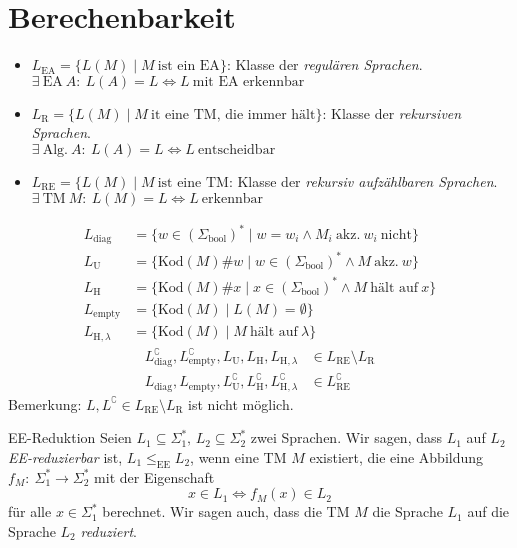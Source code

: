 \documentclass[a4paper,10pt]{article}
\begin{document}
\section{Berechenbarkeit}
\begin{itemize}
    \item $L_\textrm{EA} = \{L(M) \;|\; M\ \text{ist ein EA}\}$: Klasse der \emph{regulären Sprachen}.\\
    $\exists\ \text{EA}\ A:\: L(A) = L \iff L\ \text{mit EA erkennbar}$
    \item $L_\textrm{R} = \{L(M) \;|\; M\ \text{it eine TM, die immer hält}\}$: Klasse der \emph{rekursiven Sprachen}.\\
    $\exists\ \text{Alg.}\ A:\: L(A) = L \iff L\ \text{entscheidbar}$
    \item $L_\textrm{RE} = \{L(M) \;|\; M\ \text{ist eine TM}$: Klasse der \emph{rekursiv aufzählbaren Sprachen}.\\
    $\exists\ \text{TM}\ M:\: L(M) = L \iff L\ \text{erkennbar}$
\end{itemize}
\begin{align*}
    L_\textrm{diag} &= \{w \in (\Sigma_\textrm{bool})^* \;|\; w = w_i \land M_i\ \text{akz.}\ w_i\ \text{nicht}\}\\
    L_\textrm{U} &= \{\textrm{Kod}(M) \# w \;|\; w \in (\Sigma_\textrm{bool})^* \land M\ \text{akz.}\ w\}\\
    L_\textrm{H} &= \{\textrm{Kod}(M) \# x \;|\; x \in (\Sigma_\textrm{bool})^* \land M\ \text{hält auf}\ x\}\\
    L_\textrm{empty} &= \{\textrm{Kod}(M) \;|\; L(M) = \emptyset\}\\
    L_{\textrm{H}, \lambda} &= \{\textrm{Kod}(M) \;|\; M\ \text{hält auf}\ \lambda\}
\end{align*}
\begin{align*}
    L_\textrm{diag}^\complement, L_\textrm{empty}^\complement, L_\textrm{U}, L_\textrm{H}, L_{\textrm{H}, \lambda} &\in L_\textrm{RE} \setminus L_\textrm{R}\\
    L_\textrm{diag}, L_\textrm{empty}, L_\textrm{U}^\complement, L_\textrm{H}^\complement, L_{\textrm{H}, \lambda}^\complement &\in L_\textrm{RE}^\complement
\end{align*}
Bemerkung: $L, L^\complement \in L_\textrm{RE} \setminus L_\textrm{R}$ ist nicht möglich.
\begin{mainbox}{EE-Reduktion}
    Seien $L_1 \subseteq \Sigma_1^*,\, L_2 \subseteq \Sigma_2^*$ zwei Sprachen. Wir sagen, dass $L_1$ auf $L_2$ \emph{EE-reduzierbar} ist, \emph{$L_1 \leq_\textrm{EE} L_2$}, wenn eine TM $M$ existiert, die eine Abbildung $f_M:\: \Sigma_1^* \to \Sigma_2^*$ mit der Eigenschaft
    \[x \in L_1 \iff f_M(x) \in L_2\]
    für alle $x \in \Sigma_1^*$ berechnet. Wir sagen auch, dass die TM $M$ die Sprache $L_1$ auf die Sprache $L_2$ \emph{reduziert}.
\end{mainbox}
\end{document}

